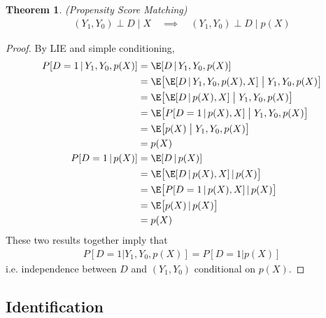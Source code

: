 \documentclass[12pt]{article}
\theoremstyle{plain}
\newtheorem{thm}{Theorem}[section]
\theoremstyle{definition}
\theoremstyle{remark}
\begin{document}
\begin{thm}
\emph{(Propensity Score Matching)}
\begin{align*}
  (Y_1,Y_0) \perp D \;|\; X
  \quad\implies\quad
  (Y_1,Y_0) \perp D \;|\; p(X)
\end{align*}
\end{thm}
\begin{proof}
By LIE and simple conditioning,
\begin{align*}
  P[D=1\,|\,Y_1,Y_0,p(X)]
  &=
  \E[D\,|\,Y_1,Y_0,p(X)]
  \\
  &=
  \E\big[
    \E[D\,|\,Y_1,Y_0,p(X),X]
    \;\big|\;Y_1,Y_0,p(X)
  \big]
  \\
  &=
  \E\big[
    \E[D\,|\,p(X),X]
    \;\big|\;Y_1,Y_0,p(X)
  \big]
  \\
  &=
  \E\big[
    P[D=1\,|\,p(X),X]
    \;\big|\;Y_1,Y_0,p(X)
  \big]
  \\
  &=
  \E\big[
    p(X)
    \;\big|\;Y_1,Y_0,p(X)
  \big]
  \\
  &=
  p(X)
  \\
  P[D=1\,|\,p(X)]
  &=
  \E[D\,|\,p(X)]
  \\
  &=
  \E\big[
    \E[D\,|\,p(X),X]
    \,|\,
    p(X)
  \big]
  \\
  &=
  \E\big[
    P[D=1\,|\,p(X),X]
    \,|\,
    p(X)
  \big]
  \\
  &=
  \E\big[
    p(X)
    \,|\,
    p(X)
  \big]
  \\
  &=
  p(X)
\end{align*}
These two results together imply that
\begin{align*}
  P[D=1|Y_1,Y_0,p(X)] = P[D=1|p(X)]
\end{align*}
i.e. independence between $D$ and $(Y_1,Y_0)$ conditional on $p(X)$.
\end{proof}






\clearpage
\subsection{Identification}
\end{document}
